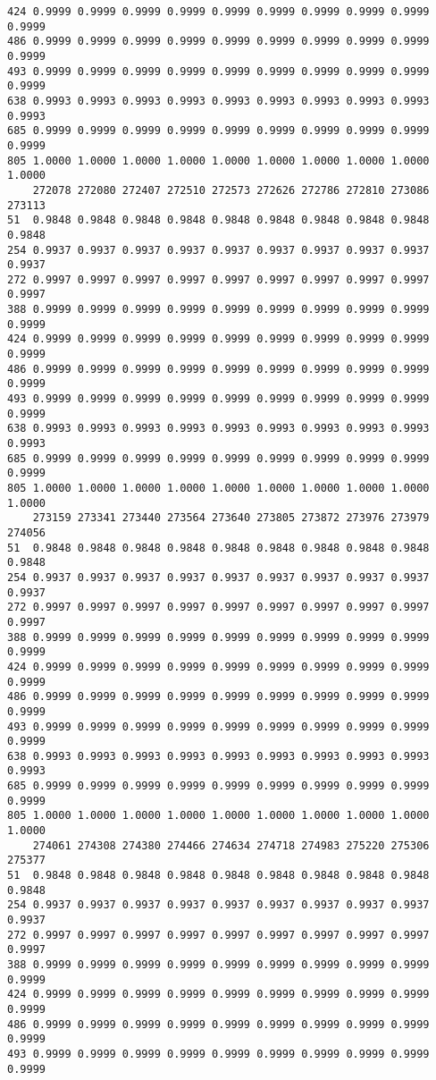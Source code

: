 \documentclass[
]{report}
\begin{document}
\begin{verbatim}
424 0.9999 0.9999 0.9999 0.9999 0.9999 0.9999 0.9999 0.9999 0.9999 0.9999
486 0.9999 0.9999 0.9999 0.9999 0.9999 0.9999 0.9999 0.9999 0.9999 0.9999
493 0.9999 0.9999 0.9999 0.9999 0.9999 0.9999 0.9999 0.9999 0.9999 0.9999
638 0.9993 0.9993 0.9993 0.9993 0.9993 0.9993 0.9993 0.9993 0.9993 0.9993
685 0.9999 0.9999 0.9999 0.9999 0.9999 0.9999 0.9999 0.9999 0.9999 0.9999
805 1.0000 1.0000 1.0000 1.0000 1.0000 1.0000 1.0000 1.0000 1.0000 1.0000
    272078 272080 272407 272510 272573 272626 272786 272810 273086 273113
51  0.9848 0.9848 0.9848 0.9848 0.9848 0.9848 0.9848 0.9848 0.9848 0.9848
254 0.9937 0.9937 0.9937 0.9937 0.9937 0.9937 0.9937 0.9937 0.9937 0.9937
272 0.9997 0.9997 0.9997 0.9997 0.9997 0.9997 0.9997 0.9997 0.9997 0.9997
388 0.9999 0.9999 0.9999 0.9999 0.9999 0.9999 0.9999 0.9999 0.9999 0.9999
424 0.9999 0.9999 0.9999 0.9999 0.9999 0.9999 0.9999 0.9999 0.9999 0.9999
486 0.9999 0.9999 0.9999 0.9999 0.9999 0.9999 0.9999 0.9999 0.9999 0.9999
493 0.9999 0.9999 0.9999 0.9999 0.9999 0.9999 0.9999 0.9999 0.9999 0.9999
638 0.9993 0.9993 0.9993 0.9993 0.9993 0.9993 0.9993 0.9993 0.9993 0.9993
685 0.9999 0.9999 0.9999 0.9999 0.9999 0.9999 0.9999 0.9999 0.9999 0.9999
805 1.0000 1.0000 1.0000 1.0000 1.0000 1.0000 1.0000 1.0000 1.0000 1.0000
    273159 273341 273440 273564 273640 273805 273872 273976 273979 274056
51  0.9848 0.9848 0.9848 0.9848 0.9848 0.9848 0.9848 0.9848 0.9848 0.9848
254 0.9937 0.9937 0.9937 0.9937 0.9937 0.9937 0.9937 0.9937 0.9937 0.9937
272 0.9997 0.9997 0.9997 0.9997 0.9997 0.9997 0.9997 0.9997 0.9997 0.9997
388 0.9999 0.9999 0.9999 0.9999 0.9999 0.9999 0.9999 0.9999 0.9999 0.9999
424 0.9999 0.9999 0.9999 0.9999 0.9999 0.9999 0.9999 0.9999 0.9999 0.9999
486 0.9999 0.9999 0.9999 0.9999 0.9999 0.9999 0.9999 0.9999 0.9999 0.9999
493 0.9999 0.9999 0.9999 0.9999 0.9999 0.9999 0.9999 0.9999 0.9999 0.9999
638 0.9993 0.9993 0.9993 0.9993 0.9993 0.9993 0.9993 0.9993 0.9993 0.9993
685 0.9999 0.9999 0.9999 0.9999 0.9999 0.9999 0.9999 0.9999 0.9999 0.9999
805 1.0000 1.0000 1.0000 1.0000 1.0000 1.0000 1.0000 1.0000 1.0000 1.0000
    274061 274308 274380 274466 274634 274718 274983 275220 275306 275377
51  0.9848 0.9848 0.9848 0.9848 0.9848 0.9848 0.9848 0.9848 0.9848 0.9848
254 0.9937 0.9937 0.9937 0.9937 0.9937 0.9937 0.9937 0.9937 0.9937 0.9937
272 0.9997 0.9997 0.9997 0.9997 0.9997 0.9997 0.9997 0.9997 0.9997 0.9997
388 0.9999 0.9999 0.9999 0.9999 0.9999 0.9999 0.9999 0.9999 0.9999 0.9999
424 0.9999 0.9999 0.9999 0.9999 0.9999 0.9999 0.9999 0.9999 0.9999 0.9999
486 0.9999 0.9999 0.9999 0.9999 0.9999 0.9999 0.9999 0.9999 0.9999 0.9999
493 0.9999 0.9999 0.9999 0.9999 0.9999 0.9999 0.9999 0.9999 0.9999 0.9999

\end{verbatim}
\end{document}

